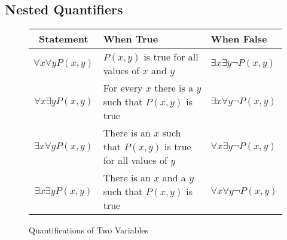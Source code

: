 \documentclass[article, 11pt]{article}
\theoremstyle{definition}
\begin{document}
    \subsection{Nested Quantifiers}
    \begin{figure}[H]
        \centering
        \begin{tabular}{|c|p{12em}|p{12em}|}
            \hline
            Statement & When True & When False \\
            \hline
            $\forall x \forall y P(x,y)$ & $P(x,y)$ is true for all values of $x$ and $y$ & $\exists x \exists y \neg P(x,y)$ \\
            \hline
            $\forall x \exists y P(x,y)$ & For every $x$ there is a $y$ such that $P(x,y)$ is true & $\exists x \forall y \neg P(x,y)$ \\
            \hline
            $\exists x \forall y P(x,y)$ & There is an $x$ such that $P(x,y)$ is true for all values of $y$ & $\forall x \exists y \neg P(x,y)$ \\
            \hline
            $\exists x \exists y P(x,y)$ & There is an $x$ and a $y$ such that $P(x,y)$ is true & $\forall x \forall y \neg P(x,y)$ \\
            \hline
        \end{tabular}
        \caption{Quantifications of Two Variables}
    \end{figure}
\end{document}
